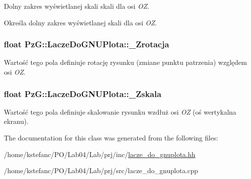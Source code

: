 Dolny zakres wyświetlanej skali skali dla osi {\itshape O\+Z}. 

Określa dolny zakres wyświetlanej skali dla osi {\itshape O\+Z}. \hypertarget{class_pz_g_1_1_lacze_do_g_n_u_plota_aa65781b1ff96dfb31a780e98ee28d6ed}{
\subsubsection[{\+\_\+\+Zrotacja}]{\setlength{\rightskip}{0pt plus 5cm}float Pz\+G\+::\+Lacze\+Do\+G\+N\+U\+Plota\+::\+\_\+\+Zrotacja\hspace{0.3cm}{\ttfamily [protected]}}}\label{class_pz_g_1_1_lacze_do_g_n_u_plota_aa65781b1ff96dfb31a780e98ee28d6ed}
Wartość tego pola definiuje rotację rysunku (zmiane punktu patrzenia) względem osi {\itshape O\+Z}. \hypertarget{class_pz_g_1_1_lacze_do_g_n_u_plota_a85446d06b2d714b2f852ef43c47c73c1}{
\subsubsection[{\+\_\+\+Zskala}]{\setlength{\rightskip}{0pt plus 5cm}float Pz\+G\+::\+Lacze\+Do\+G\+N\+U\+Plota\+::\+\_\+\+Zskala\hspace{0.3cm}{\ttfamily [protected]}}}\label{class_pz_g_1_1_lacze_do_g_n_u_plota_a85446d06b2d714b2f852ef43c47c73c1}
Wartość tego pola definiuje skalowanie rysunku wzdłuż osi {\itshape O\+Z} (oś wertykalna ekranu). 

The documentation for this class was generated from the following files\+:\begin{DoxyCompactItemize}
\item 
/home/kstefanc/\+P\+O/\+Lab04/\+Lab/prj/inc/\hyperlink{lacze__do__gnuplota_8hh}{lacze\+\_\+do\+\_\+gnuplota.\+hh}\item 
/home/kstefanc/\+P\+O/\+Lab04/\+Lab/prj/src/lacze\+\_\+do\+\_\+gnuplota.\+cpp\end{DoxyCompactItemize}
